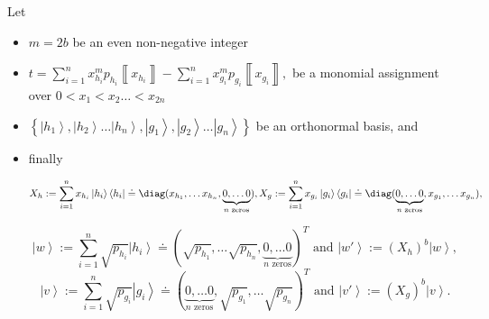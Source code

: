 \documentclass{article}
\begin{document}
\begin{proposition}
  \label{prop:ExactSolnBalancedMonomialAligned}Let
  \begin{itemize}
    \item $m=2b$ be an even non-negative integer
    \item $
            t=\sum_{i=1}^{n}x_{h_{i}}^{m}p_{h_{i}}\left\llbracket x_{h_{i}}\right\rrbracket -\sum_{i=1}^{n}x_{g_{i}}^{m}p_{g_{i}}\left\llbracket x_{g_{i}}\right\rrbracket ,
          $ be a monomial assignment over $0<x_{1}<x_{2}\dots<x_{2n}$
    \item $\left\{ \left|h_{1}\right\rangle ,\left|h_{2}\right\rangle \dots\left|h_{n}\right\rangle ,\left|g_{1}\right\rangle ,\left|g_{2}\right\rangle \dots\left|g_{n}\right\rangle \right\} $
          be an orthonormal basis, and
    \item finally
          \begin{footnotesize}
            \begin{displaymath}
              X_{h}:=\sum_{i=1}^{n}x_{h_{i}}\left|h_{i}\right\rangle \left\langle h_{i}\right|\doteq\diag(x_{h_{1}},\dots x_{h_{n}},\underbrace{0,\dots0}_{n\text{ zeros}}),
              X_{g}:=\sum_{i=1}^{n}x_{g_{i}}\left|g_{i}\right\rangle \left\langle g_{i}\right|\doteq\diag(\underbrace{0,\dots0}_{n\text{ zeros}},x_{g_{1}},\dots x_{g_{n}}),
            \end{displaymath}
          \end{footnotesize}
          \begin{displaymath}
            \left|w\right\rangle :=\sum_{i=1}^{n}\sqrt{p_{h_{i}}}\left|h_{i}\right\rangle \doteq(\sqrt{p_{h_{1}}},\dots\sqrt{p_{h_{n}}},\underbrace{0,\dots0}_{n\text{ zeros}})^{T} \text{ and } \left|w'\right\rangle :=(X_{h})^{b}\left|w\right\rangle,
          \end{displaymath}
          \begin{displaymath}
            \left|v\right\rangle :=\sum_{i=1}^{n}\sqrt{p_{g_{i}}}\left|g_{i}\right\rangle \doteq(\underbrace{0,\dots0}_{n\text{ zeros}},\sqrt{p_{g_{1}}},\dots\sqrt{p_{g_{n}}})^{T} \text{ and }\left|v'\right\rangle :=(X_{g})^{b}\left|v\right\rangle.
          \end{displaymath}


\end{itemize}
\end{proposition}
\end{document}
